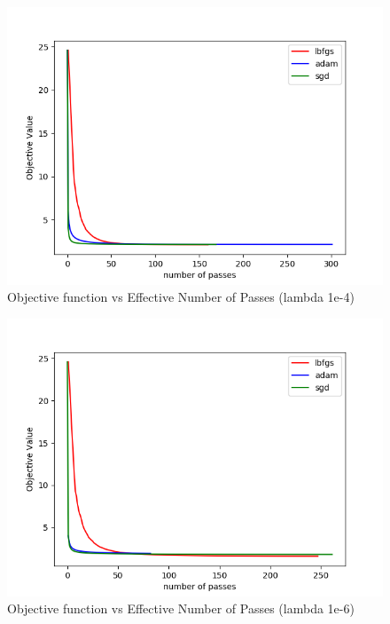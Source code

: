 \documentclass[11pt]{report}
\begin{document}
\begin{figure}[b]
\centering
\includegraphics[scale=0.4]{objval_ef_1e4.png}
\caption{Objective function vs Effective Number of Passes (lambda 1e-4)}
\end{figure}

\begin{figure}[b]
\centering
\includegraphics[scale=0.4]{objval_ef_1e6.png}
\caption{Objective function vs Effective Number of Passes (lambda 1e-6)}
\end{figure}
\end{document}
